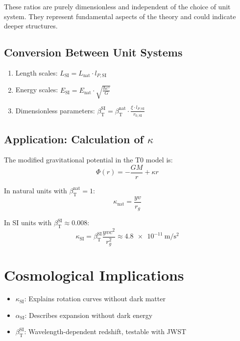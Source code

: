\documentclass[12pt,a4paper]{article}
\newcommand{\betaT}{\beta_{\text{T}}}
\begin{document}
	These ratios are purely dimensionless and independent of the choice of unit system. They represent fundamental aspects of the theory and could indicate deeper structures.
	
	\subsection{Conversion Between Unit Systems}
	
	\begin{tcolorbox}[colback=blue!5!white, colframe=blue!75!black, title=Conversion Scheme]
		\begin{enumerate}
			\item Length scales: \(L_{\text{SI}} = L_{\text{nat}} \cdot l_{P,\text{SI}}\)
			\item Energy scales: \(E_{\text{SI}} = E_{\text{nat}} \cdot \sqrt{\frac{\hbar c^5}{G}}\)
			\item Dimensionless parameters: \(\betaT^{\text{SI}} = \betaT^{\text{nat}} \cdot \frac{\xi \cdot l_{P,\text{SI}}}{r_{0,\text{SI}}}\)
		\end{enumerate}
	\end{tcolorbox}
	
	\subsection{Application: Calculation of \(\kappa\)}
	
	The modified gravitational potential in the T0 model is:
	\begin{equation}
		\Phi(r) = -\frac{G M}{r} + \kappa r
	\end{equation}
	
	In natural units with \(\betaT^{\text{nat}} = 1\):
	\begin{equation}
		\kappa_{\text{nat}} = \frac{y v}{r_g}
	\end{equation}
	
	In SI units with \(\betaT^{\text{SI}} \approx 0.008\):
	\begin{equation}
		\kappa_{\text{SI}} = \betaT^{\text{SI}} \frac{y v c^2}{r_g^2} \approx \SI{4.8e-11}{\meter\per\second\squared}
	\end{equation}
	
	\section{Cosmological Implications}
	
	\begin{itemize}
		\item \(\kappa_{\text{SI}}\): Explains rotation curves without dark matter
		\item \(\alpha_{\text{SI}}\): Describes expansion without dark energy
		\item \(\betaT^{\text{SI}}\): Wavelength-dependent redshift, testable with JWST
	\end{itemize}
	
\end{document}
